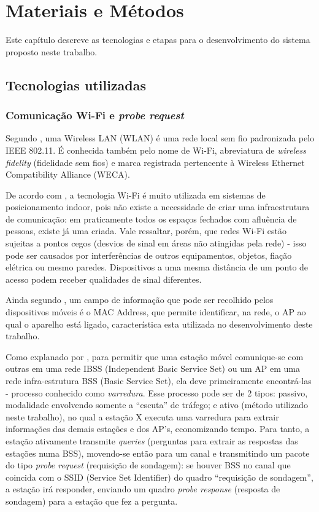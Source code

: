 
\chapter{Materiais e Métodos}
\label{metodologia}
Este capítulo descreve as tecnologias e etapas para o desenvolvimento
do sistema proposto neste trabalho.

\section{Tecnologias utilizadas}
\label{tecnologias-usadas}

\subsection{Comunicação Wi-Fi e \emph{probe request}}

Segundo , uma Wireless LAN (WLAN) é uma rede local sem
fio padronizada pelo IEEE 802.11. É conhecida também pelo nome de Wi-Fi,
abreviatura de \emph{wireless fidelity} (fidelidade sem fios) e marca registrada
pertencente à Wireless Ethernet Compatibility Alliance (WECA).

De acordo com , a tecnologia Wi-Fi é muito utilizada em
sistemas de posicionamento indoor, pois não existe a necessidade de criar uma
infraestrutura de comunicação: em praticamente todos os espaços fechados com
afluência de pessoas, existe já uma criada. Vale ressaltar, porém, que redes
Wi-Fi estão sujeitas a pontos cegos (desvios de sinal em áreas não atingidas
pela rede) - isso pode ser causados por interferências de outros equipamentos,
objetos, fiação elétrica ou mesmo paredes. Dispositivos a uma mesma distância de
um ponto de acesso podem receber qualidades de sinal diferentes.

Ainda segundo , um campo de informação que pode ser
recolhido pelos dispositivos móveis é o MAC Address, que permite identificar, na
rede, o AP ao qual o aparelho está ligado, característica esta utilizada no
desenvolvimento deste trabalho.

Como explanado por , para permitir que uma estação móvel
comunique-se com outras em uma rede IBSS (Independent Basic Service Set) ou um
AP em uma rede infra-estrutura BSS (Basic Service Set), ela deve primeiramente
encontrá-las - processo conhecido como \emph{varredura}. Esse processo pode ser de 2
tipos: passivo, modalidade envolvendo somente a ``escuta'' de tráfego; e ativo
(método utilizado neste trabalho), no qual a estação X executa uma varredura
para extrair informações das demais estações e dos AP’s, economizando tempo.
Para tanto, a estação ativamente transmite \emph{queries} (perguntas para
extrair as respostas das estações numa BSS), movendo-se então para um canal e
transmitindo um pacote do tipo \emph{probe request} (requisição de sondagem): se
houver BSS no canal que coincida com o SSID (Service Set Identifier) do quadro
``requisição de sondagem'', a estação irá responder, enviando um quadro
\emph{probe response} (resposta de sondagem) para a estação que fez a pergunta.


